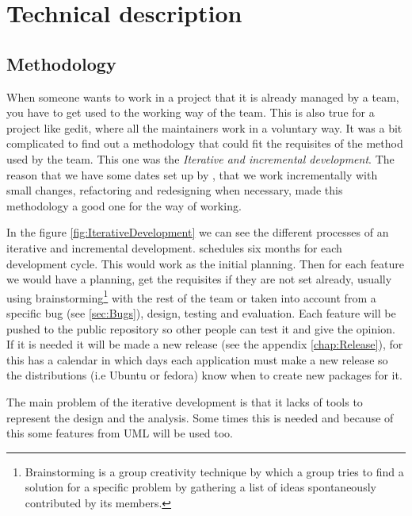 
\chapter{Technical description}


\section{Methodology}\label{sec:Methodology}

When someone wants to work in a project that it is already managed by a team, you have to get used to the working way of the team. This is also true for a project like gedit, where all the maintainers work in a voluntary way. It was a bit complicated to find out a methodology that could fit the requisites of the method used by the team. This one was the \emph{Iterative and incremental development}. The reason that we have some dates set up by \GNOME, that we work incrementally with small changes, refactoring and redesigning when necessary, made this methodology a good one for the way of working.



In the figure \ref{fig:IterativeDevelopment} we can see the different processes of an iterative and incremental development. \GNOME schedules six months for each development cycle. This would work as the initial planning. Then for each feature we would have a planning, get the requisites if they are not set already, usually using brainstorming\footnote{Brainstorming is a group creativity technique by which a group tries to find a solution for a specific problem by gathering a list of ideas spontaneously contributed by its members.} with the rest of the team or taken into account from a specific bug (see \ref{sec:Bugs}), design, testing and evaluation. Each feature will be pushed to the public repository so other people can test it and give the opinion. If it is needed it will be made a new release (see the appendix \ref{chap:Release}), for this \GNOME has a calendar in which days each application must make a new release so the distributions (i.e Ubuntu or fedora) know when to create new packages for it.

The main problem of the iterative development is that it lacks of tools to represent the design and the analysis. Some times this is needed and because of this some features from UML will be used too.

